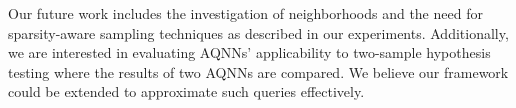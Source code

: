 \documentclass[sigconf, nonacm]{acmart}
\newcommand{\sprint}{\text{{\footnotesize SPRinT}}\xspace}
\begin{document}
Our future work includes the investigation of neighborhoods and the need for sparsity-aware sampling techniques as described in our experiments. Additionally, we are interested in evaluating AQNNs' applicability to two-sample hypothesis testing where the results of two AQNNs are compared. We believe our \sprint framework could be extended to approximate such queries effectively.







\end{document}
